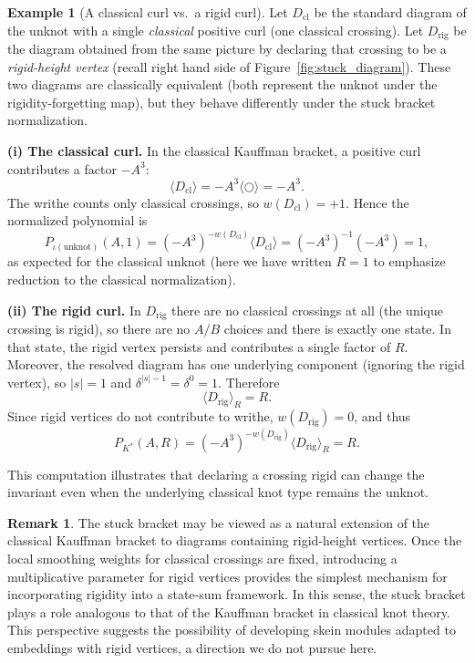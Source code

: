 \documentclass[11pt,a4paper]{article}
\theoremstyle{plain}
\theoremstyle{definition}
\newtheorem{example}[theorem]{Example}
\newtheorem{remark}[theorem]{Remark}
\begin{document}
\begin{example}[A classical curl vs.\ a rigid curl]\label{ex:curl_vs_rigidcurl}
Let $D_{\mathrm{cl}}$ be the standard diagram of the unknot with a single \emph{classical} positive curl (one classical crossing). Let $D_{\mathrm{rig}}$ be the diagram obtained from the same picture
by declaring that crossing to be a \emph{rigid-height vertex} (recall right hand side of Figure~\ref{fig:stuck_diagram}). These two diagrams
are classically equivalent (both represent the unknot under the rigidity-forgetting map), but they behave differently under the stuck bracket normalization.

\smallskip\noindent
\textbf{(i) The classical curl.}
In the classical Kauffman bracket, a positive curl contributes a factor $-A^3$:
\[
\langle D_{\mathrm{cl}}\rangle = -A^3\langle \bigcirc\rangle = -A^3.
\]
The writhe counts only classical crossings, so $w(D_{\mathrm{cl}})=+1$. Hence the normalized
polynomial is
\[
P_{\iota(\text{unknot})}(A,1)
= (-A^3)^{-w(D_{\mathrm{cl}})}\langle D_{\mathrm{cl}}\rangle
= (-A^3)^{-1}(-A^3)=1,
\]
as expected for the classical unknot (here we have written $R=1$ to emphasize reduction to the
classical normalization).

\smallskip\noindent
\textbf{(ii) The rigid curl.}
In $D_{\mathrm{rig}}$ there are no classical crossings at all (the unique crossing is rigid), so there are no $A/B$ choices and there is exactly one state. In that state, the rigid vertex persists and contributes a single factor of $R$. Moreover, the resolved diagram has one underlying component (ignoring the rigid vertex), so $|s|=1$ and $\delta^{|s|-1}=\delta^0=1$. Therefore
\[
\langle D_{\mathrm{rig}}\rangle_R = R.
\]
Since rigid vertices do not contribute to writhe, $w(D_{\mathrm{rig}})=0$, and thus
\[
P_{K^*}(A,R)
= (-A^3)^{-w(D_{\mathrm{rig}})}\langle D_{\mathrm{rig}}\rangle_R
= R.
\]

\smallskip
This computation illustrates that declaring a crossing rigid can change the invariant even when the
underlying classical knot type remains the unknot.
\end{example}



\begin{remark}
The stuck bracket may be viewed as a natural extension of the classical Kauffman bracket to diagrams containing rigid-height vertices. Once the local smoothing weights for classical crossings are fixed, introducing a multiplicative parameter for rigid vertices provides the simplest mechanism for incorporating rigidity into a state-sum framework. In this sense, the stuck bracket plays a role analogous to that of the Kauffman bracket in classical knot theory. This perspective suggests the possibility of developing skein modules \cite{P} adapted to embeddings with rigid vertices, a direction we do not pursue here.
\end{remark}
\end{document}
